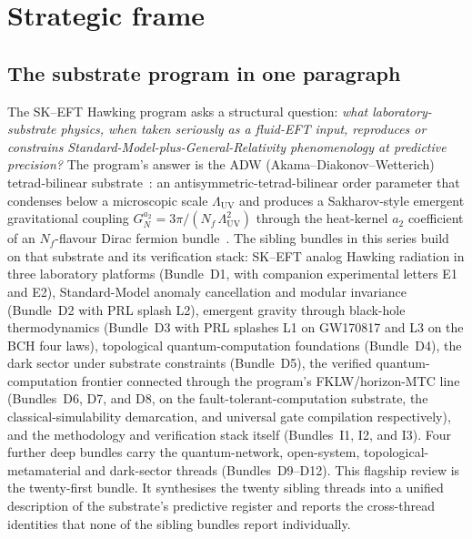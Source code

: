 \documentclass[aps,prd,reprint,nofootinbib,superscriptaddress]{revtex4-2}
\begin{document}
\maketitle

\tableofcontents

\section{Strategic frame}
\label{sec:strategic-frame}

\subsection{The substrate program in one paragraph}

The SK--EFT Hawking program asks a structural question: \emph{what
laboratory-substrate physics, when taken seriously as a fluid-EFT input,
reproduces or constrains Standard-Model-plus-General-Relativity
phenomenology at predictive precision?} The program's answer is the
ADW (Akama--Diakonov--Wetterich) tetrad-bilinear substrate~\cite{Akama1978,
Diakonov2011}: an
antisymmetric-tetrad-bilinear order parameter that condenses below a
microscopic scale $\Lambda_{\mathrm{UV}}$ and produces a Sakharov-style
emergent gravitational coupling
$G_N^{a_2} = 3\pi/(N_f\,\Lambda_{\mathrm{UV}}^{2})$
through the heat-kernel $a_2$ coefficient of an
$N_f$-flavour Dirac fermion bundle~\cite{Sakharov1968,Adler1980,
Vassilevich2003}. The sibling bundles in this series build on that
substrate and its verification stack: SK--EFT analog Hawking
radiation in three laboratory platforms (Bundle~D1, with companion
experimental letters E1 and E2), Standard-Model anomaly cancellation
and modular invariance (Bundle~D2 with PRL splash L2), emergent gravity
through black-hole thermodynamics (Bundle~D3 with PRL splashes L1 on
GW170817 and L3 on the BCH four laws), topological quantum-computation
foundations (Bundle~D4), the dark sector under substrate constraints
(Bundle~D5), the verified quantum-computation frontier connected
through the program's FKLW/horizon-MTC line (Bundles~D6, D7, and D8,
on the fault-tolerant-computation substrate, the
classical-simulability demarcation, and universal gate compilation
respectively), and the methodology and verification stack itself
(Bundles~I1, I2, and I3). Four further deep bundles carry the
quantum-network, open-system, topological-metamaterial and
dark-sector threads (Bundles~D9--D12). This flagship review is the
twenty-first bundle. It synthesises the twenty sibling threads into a unified
description of the substrate's predictive register and reports the
cross-thread identities that none of the sibling bundles report
individually.
\end{document}
